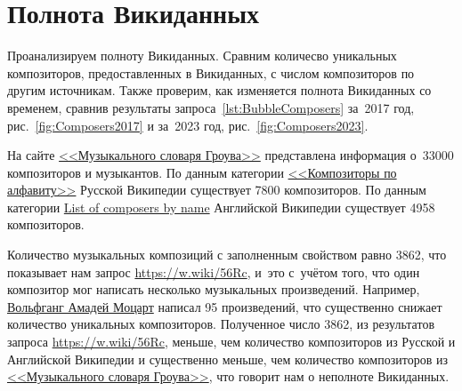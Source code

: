 \section{Полнота Викиданных}

Проанализируем полноту Викиданных. 
Сравним количесво уникальных композиторов, предоставленных в Викиданных, 
с числом композиторов по другим источникам. 
Также проверим, как изменяется полнота Викиданных со временем, 
сравнив результаты запроса~\ref{lst:BubbleComposers} за~2017 год, 
рис.~\ref{fig:Composers2017} и за~2023 год, рис.~\ref{fig:Composers2023}.

На сайте  
\href{https://ru.wikipedia.org/?curid=1362802}
     {<<Музыкального словаря Гроува>>} 
представлена информация о~\num{33000} композиторов и музыкантов. 
По данным категории 
\href{https://ru.wikipedia.org/?curid=155531}
     {<<Композиторы по алфавиту>>} 
Русской Википедии существует \num{7800} композиторов. 
По данным категории 
\href{https://en.wikipedia.org/?curid=6921880}
     {List of composers by name} 
Английской Википедии существует \num{4958} композиторов.

Количество музыкальных композиций с заполненным свойством  равно \num{3862}, 
что показывает нам запрос \href{https://w.wiki/56Rc}{https://w.wiki/56Rc}, 
и~это с~учётом того, что один композитор мог написать несколько музыкальных произведений. 
Например, \href{https://ru.wikipedia.org/wiki/Моцарт,_Вольфганг_Амадей}{Вольфганг Амадей Моцарт} 
написал 95 произведений, что существенно снижает количество уникальных композиторов. 
Полученное число 3862, 
из результатов запроса \href{https://w.wiki/56Rc}{https://w.wiki/56Rc}, меньше, 
чем количество композиторов из Русской и Английской Википедии и существенно меньше, 
чем количество композиторов из \href{https://ru.wikipedia.org/wiki/Музыкальный_словарь_Гроува}{<<Музыкального словаря Гроува>>}, что говорит нам о неполноте Викиданных.




